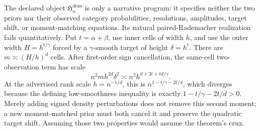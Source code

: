 The declared object \(\mathfrak H_n^{\mathrm{dens}}\) is only a narrative program: it specifies neither the two priors nor their observed category probabilities, resolutions, amplitudes, target shift, or moment-matching equations.  Its natural paired-Rademacher realization fails quantitatively.  Put \(t=\alpha+\beta\), use inner cells of width \(h\), and use the outer width \(H=h^{t/\gamma}\) forced by a \(\gamma\)-smooth target of height \(\delta=h^t\).  There are \(m\asymp(H/h)^d\) cells.  After first-order sign cancellation, the same-cell two-observation term has scale
\[
n^2m h^{2d}\delta^2\asymp n^2h^{d+2t+td/\gamma}.
\]
At the advertised rank scale \(h=n^{-1/d}\), this is \(n^{1-t/\gamma-2t/d}\), which diverges because the defining low-smoothness inequality is exactly \(1-t/\gamma-2t/d>0\).  Merely adding signed density perturbations does not remove this second moment; a new moment-matched prior must both cancel it and preserve the quadratic target shift.  Assuming those two properties would assume the theorem's crux.